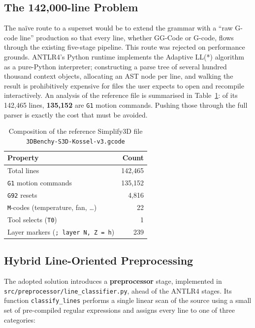 \subsection*{The 142{,}000-line Problem}

The naïve route to a superset would be to extend the grammar with a ``raw G-code line'' production so that every line, whether GG-Code or G-code, flows through the existing five-stage pipeline. This route was rejected on performance grounds. ANTLR4's Python runtime implements the Adaptive LL(*) algorithm as a pure-Python interpreter; constructing a parse tree of several hundred thousand context objects, allocating an AST node per line, and walking the result is prohibitively expensive for files the user expects to open and recompile interactively. An analysis of the reference file is summarised in Table~\ref{tab:benchy-stats}: of its 142{,}465 lines, \textbf{135{,}152} are \texttt{G1} motion commands. Pushing those through the full parser is exactly the cost that must be avoided.

\begin{table}[H]
\centering
\begin{tabular}{|l|r|}
\hline
\textbf{Property} & \textbf{Count} \\
\hline
Total lines & 142{,}465 \\
\texttt{G1} motion commands & 135{,}152 \\
\texttt{G92} resets & 4{,}816 \\
\texttt{M}-codes (temperature, fan, \ldots) & 22 \\
Tool selects (\texttt{T0}) & 1 \\
Layer markers (\texttt{; layer N, Z = h}) & 239 \\
\hline
\end{tabular}
\caption{Composition of the reference Simplify3D file \texttt{3DBenchy-S3D-Kossel-v3.gcode}}
\label{tab:benchy-stats}
\end{table}

\subsection*{Hybrid Line-Oriented Preprocessing}

The adopted solution introduces a \textbf{preprocessor} stage, implemented in \texttt{src/preprocessor/line\_classifier.py}, ahead of the ANTLR4 stages. Its function \texttt{classify\_lines} performs a single linear scan of the source using a small set of pre-compiled regular expressions and assigns every line to one of three categories:


